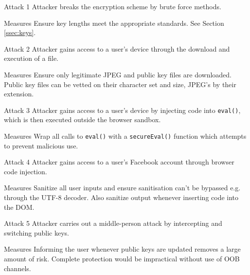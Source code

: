 \begin{sdesc} \addtolength{\itemsep}{-0.5\baselineskip}
    \item[Attack 1] Attacker breaks the encryption scheme by brute force methods.
    \item[Measures] Ensure key lengths meet the appropriate standards. See Section \ref{ssec:keys}.
\end{sdesc}

\begin{sdesc} \addtolength{\itemsep}{-0.5\baselineskip}
    \item[Attack 2] Attacker gains access to a user's device through the download and execution of a file.
    \item[Measures] Ensure only legitimate JPEG and public key files are downloaded. Public key files can be vetted on their character set and size, JPEG's by their extension.
\end{sdesc}

\begin{sdesc} \addtolength{\itemsep}{-0.5\baselineskip}
    \item[Attack 3] Attacker gains access to a user's device by injecting code into {\tt eval()}, which is then executed outside the browser sandbox.
    \item[Measures] Wrap all calls to {\tt eval()} with a {\tt secureEval()} function which attempts to prevent malicious use. 
\end{sdesc}

\begin{sdesc} \addtolength{\itemsep}{-0.5\baselineskip}
    \item[Attack 4] Attacker gains access to a user's Facebook account through browser code injection.
    \item[Measures] Sanitize all user inputs and ensure sanitisation can't be bypassed e.g. through the UTF-8 decoder\cite{utf8}. Also sanitize output whenever inserting code into the DOM.
\end{sdesc}

\begin{sdesc}\addtolength{\itemsep}{-0.5\baselineskip}
    \item[Attack 5] Attacker carries out a middle-person attack by intercepting and switching public keys.
    \item[Measures] Informing the user whenever public keys are updated removes a large amount of risk. Complete protection would be impractical without use of OOB channels.
\end{sdesc}

